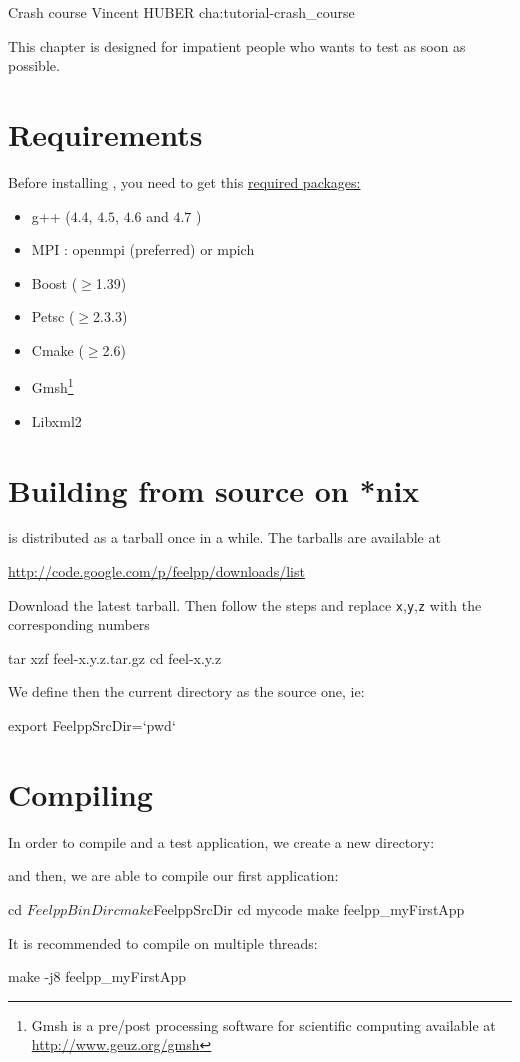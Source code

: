             {Crash course}
            {Vincent HUBER}
            {cha:tutorial-crash\_course}

This chapter is designed for impatient people who wants to test \feel as soon as possible.
\section{Requirements}
Before installing \feel, you need to get this \underline{required packages:}\\
\begin{itemize}
\item g++ ($4.4$, $4.5$, $4.6$ and $4.7$  )
\item MPI : openmpi (preferred) or mpich
\item Boost ($\geq$1.39)
\item Petsc ($\geq$2.3.3)
\item Cmake ($\geq$2.6)
\item Gmsh\footnote{Gmsh is a pre/post processing software for scientific
computing available at \url{http://www.geuz.org/gmsh}}
\item Libxml2
\end{itemize}

\section{Building \feel from source on *nix}
\feel is distributed as a tarball once in a while. The tarballs are available
at
\begin{center}
  \href{http://code.google.com/p/feelpp/downloads/list}{http://code.google.com/p/feelpp/downloads/list}
\end{center}
Download the latest tarball. Then follow the steps and replace
\texttt{x},\texttt{y},\texttt{z} with the corresponding numbers

\begin{unixcom}
  tar xzf feel-x.y.z.tar.gz
  cd feel-x.y.z
\end{unixcom}
We define then the current directory as the source one, ie:
\begin{unixcom}
  export FeelppSrcDir=`pwd`
\end{unixcom}

\section{Compiling}
In order to compile \feel and a test application, we create a new directory:
and then, we are able to compile our first application:
\begin{unixcom}
  cd $FeelppBinDir
  cmake $FeelppSrcDir
  cd mycode
  make feelpp_myFirstApp
\end{unixcom}
It is recommended to compile on multiple threads:
\begin{unixcom}
  make -j8 feelpp_myFirstApp
\end{unixcom}

